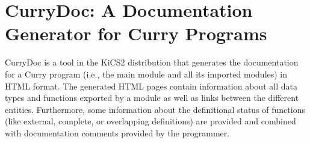 \section{CurryDoc: A Documentation Generator for Curry Programs}

CurryDoc
is a tool in the KiCS2 distribution that generates
the documentation for a Curry program (i.e., the main module
and all its imported modules) in HTML format.
The generated HTML pages contain information about
all data types and functions exported by a module as well
as links between the different entities.
Furthermore, some information about the definitional status
of functions (like external, complete, or
overlapping definitions) are provided and combined with
documentation comments provided by the programmer.


